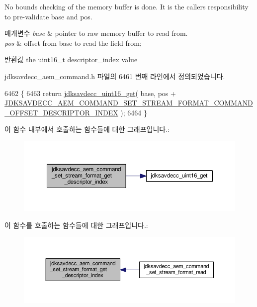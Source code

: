 No bounds checking of the memory buffer is done. It is the caller\textquotesingle{}s responsibility to pre-\/validate base and pos.


\begin{DoxyParams}{매개변수}
{\em base} & pointer to raw memory buffer to read from. \\
\hline
{\em pos} & offset from base to read the field from; \\
\hline
\end{DoxyParams}
\begin{DoxyReturn}{반환값}
the uint16\+\_\+t descriptor\+\_\+index value 
\end{DoxyReturn}


jdksavdecc\+\_\+aem\+\_\+command.\+h 파일의 6461 번째 라인에서 정의되었습니다.


\begin{DoxyCode}
6462 \{
6463     \textcolor{keywordflow}{return} \hyperlink{group__endian_ga3fbbbc20be954aa61e039872965b0dc9}{jdksavdecc\_uint16\_get}( base, pos + 
      \hyperlink{group__command__set__stream__format_ga19cb37fc561c782663dd8848f8ae1afa}{JDKSAVDECC\_AEM\_COMMAND\_SET\_STREAM\_FORMAT\_COMMAND\_OFFSET\_DESCRIPTOR\_INDEX}
       );
6464 \}
\end{DoxyCode}


이 함수 내부에서 호출하는 함수들에 대한 그래프입니다.\+:
\nopagebreak
\begin{figure}[H]
\begin{center}
\leavevmode
\includegraphics[width=350pt]{group__command__set__stream__format_gaa334a23ebba7bd3f2d5c193a2283c38e_cgraph}
\end{center}
\end{figure}




이 함수를 호출하는 함수들에 대한 그래프입니다.\+:
\nopagebreak
\begin{figure}[H]
\begin{center}
\leavevmode
\includegraphics[width=350pt]{group__command__set__stream__format_gaa334a23ebba7bd3f2d5c193a2283c38e_icgraph}
\end{center}
\end{figure}


